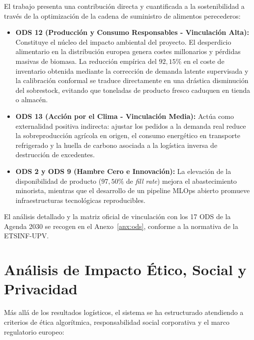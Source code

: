 El trabajo presenta una contribución directa y cuantificada a la sostenibilidad a través de la optimización de la cadena de suministro de alimentos perecederos:

\begin{itemize}
    \item \textbf{ODS 12 (Producción y Consumo Responsables - Vinculación Alta):} Constituye el núcleo del impacto ambiental del proyecto. El desperdicio alimentario en la distribución europea genera costes millonarios y pérdidas masivas de biomasa. La reducción empírica del \textbf{$92{,}15\%$} en el coste de inventario obtenida mediante la corrección de demanda latente supervisada y la calibración conformal se traduce directamente en una drástica disminución del sobrestock, evitando que toneladas de producto fresco caduquen en tienda o almacén.
    \item \textbf{ODS 13 (Acción por el Clima - Vinculación Media):} Actúa como externalidad positiva indirecta: ajustar los pedidos a la demanda real reduce la sobreproducción agrícola en origen, el consumo energético en transporte refrigerado y la huella de carbono asociada a la logística inversa de destrucción de excedentes.
    \item \textbf{ODS 2 y ODS 9 (Hambre Cero e Innovación):} La elevación de la disponibilidad de producto ($97{,}50\%$ de \textit{fill rate}) mejora el abastecimiento minorista, mientras que el desarrollo de un pipeline MLOps abierto promueve infraestructuras tecnológicas reproducibles.
\end{itemize}

El análisis detallado y la matriz oficial de vinculación con los 17 ODS de la Agenda 2030 se recogen en el Anexo~\ref{anx:ods}, conforme a la normativa de la ETSINF-UPV.

\section{Análisis de Impacto Ético, Social y Privacidad}
\label{sec:impacto_etico}

Más allá de los resultados logísticos, el sistema se ha estructurado atendiendo a criterios de ética algorítmica, responsabilidad social corporativa y el marco regulatorio europeo:

